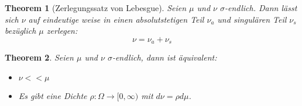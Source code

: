\documentclass[10pt,a4paper]{article}
\newtheorem{theorem}{Theorem}
\begin{document}
\begin{theorem}[Zerlegungssatz von Lebesgue]
	Seien $\mu$ und $\nu$ $\sigma$-endlich. Dann lässt sich $\nu$ auf eindeutige weise in einen absolutstetigen Teil $\nu_a$ und singulären Teil $\nu_s$ bezüglich $\mu$ zerlegen:
	$$\nu = \nu_a + \nu_s$$
\end{theorem}
\begin{theorem}
	Seien $\mu$ und $\nu$ $\sigma$-endlich, dann ist äquivalent:
	\begin{itemize}
		\item $\nu << \mu$
		\item Es gibt eine Dichte $\rho: \Omega \to [0,\infty)$ mit $d\nu = \rho d\mu$.
	\end{itemize}
\end{theorem}
\end{document}
